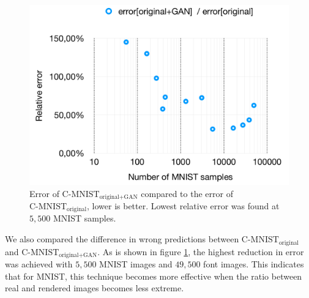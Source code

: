 \documentclass[10pt,twocolumn,letterpaper]{article}
\begin{document}
\begin{figure}[h]
\begin{center}
	\includegraphics[width=0.9\linewidth]{../graph-error-comparison.png}
\end{center}
   \caption{Error of $\text{C-MNIST}_\text{original+GAN}$ compared to the error of $\text{C-MNIST}_\text{original}$, lower is better. Lowest relative error was found at $5,500$ MNIST samples.}
\label{fig:graph-relative-error}
\end{figure}

We also compared the difference in wrong predictions between $\text{C-MNIST}_\text{original}$ and $\text{C-MNIST}_\text{original+GAN}$. As is shown in figure \ref{fig:graph-relative-error}, the highest reduction in error was achieved with $5,500$ MNIST images and $49,500$ font images. This indicates that for MNIST, this technique becomes more effective when the ratio between real and rendered images becomes less extreme.
\end{document}
